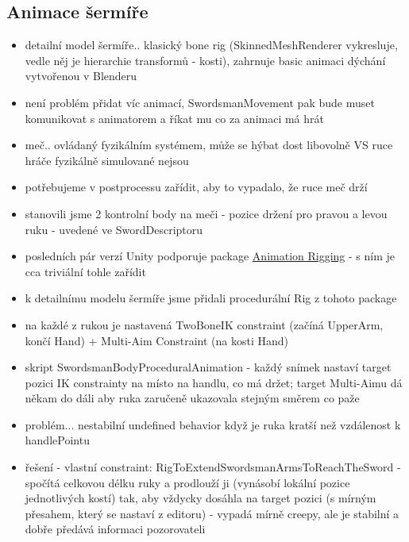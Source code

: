 

\subsection{Animace šermíře} \label{swordsmanAnimationSubsection}
\begin{itemize}
  \item detailní model šermíře.. klasický bone rig (SkinnedMeshRenderer vykresluje, vedle něj je hierarchie transformů - kosti), zahrnuje basic animaci dýchání vytvořenou v Blenderu
  \item není problém přidat víc animací, SwordsmanMovement pak bude muset komunikovat s animatorem a říkat mu co za animaci má hrát
  \item meč.. ovládaný fyzikálním systémem, může se hýbat dost libovolně VS ruce hráče fyzikálně simulované nejsou
  \item potřebujeme v postprocessu zařídit, aby to vypadalo, že ruce meč drží
  \item stanovili jsme 2 kontrolní body na meči - pozice držení pro pravou a levou ruku - uvedené ve SwordDescriptoru
  \item posledních pár verzí Unity podporuje package \href{https://docs.unity3d.com/Packages/com.unity.animation.rigging@1.3/manual/index.html}{Animation Rigging} - s ním je cca triviální tohle zařídit
  \item k detailnímu modelu šermíře jsme přidali procedurální Rig z tohoto package
  \item na každé z rukou je nastavená TwoBoneIK constraint (začíná UpperArm, končí Hand) + Multi-Aim Constraint (na kosti Hand)
  \item skript SwordsmanBodyProceduralAnimation - každý snímek nastaví target pozici IK constrainty na místo na handlu, co má držet; target Multi-Aimu dá někam do dáli aby ruka zaručeně ukazovala stejným směrem co paže 
  \item problém... nestabilní undefined behavior když je ruka kratší než vzdálenost k handlePointu
  \item řešení - vlastní constraint: RigToExtendSwordsmanArmsToReachTheSword - spočítá celkovou délku ruky a prodlouží ji (vynásobí lokální pozice jednotlivých kostí) tak, aby vždycky dosáhla na target pozici (s mírným přesahem, který se nastaví z editoru) - vypadá mírně creepy, ale je stabilní a dobře předává informaci pozorovateli
\end{itemize}


